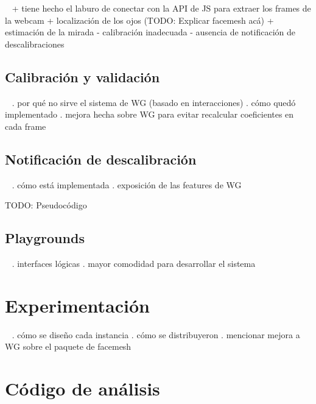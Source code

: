 \documentclass{beamer}
\begin{document}
\begin{frame}{~}
+ tiene hecho el laburo de conectar con la API de JS para extraer los frames de
  la webcam
  + localización de los ojos (TODO: Explicar facemesh acá)
+ estimación de la mirada
- calibración inadecuada
- ausencia de notificación de descalibraciones
\end{frame}

\subsection{Calibración y validación}

\begin{frame}{~}
. por qué no sirve el sistema de WG (basado en interacciones)
. cómo quedó implementado
. mejora hecha sobre WG para evitar recalcular coeficientes en cada frame
\end{frame}

\subsection{Notificación de descalibración}

\begin{frame}{~}
. cómo está implementada
. exposición de las features de WG

TODO: Pseudocódigo
\end{frame}

\subsection{Playgrounds}

\begin{frame}{~}
. interfaces lógicas
. mayor comodidad para desarrollar el sistema
\end{frame}

\section{Experimentación}

\begin{frame}{~}
. cómo se diseño cada instancia
. cómo se distribuyeron
. mencionar mejora a WG sobre el paquete de facemesh
\end{frame}

\section{Código de análisis}
\end{document}
